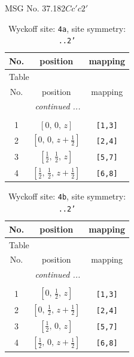 \documentclass[fleqn,8pt]{jsarticle}
\begin{document}
\setcounter{MaxMatrixCols}{32}

\renewcommand{\tablename}{Table~}
\renewcommand{\figurename}{Figure~}
\begin{center}
\LARGE
MSG No. 37.182\quad$Cc'c2'$
\end{center}
\renewcommand{\arraystretch}{1.2}
\begin{longtable}{ccc}
\caption{Wyckoff site: {\tt 4a}, site symmetry: {\tt ..2'}}
 \\
 \hline \hline
No. & position & mapping \\ \hline \endfirsthead

\multicolumn{2}{l}{\tablename\ \thetable{}} \\
 \hline \hline
No. & position & mapping \\ \hline \endhead

 \hline \hline
\multicolumn{2}{r}{\footnotesize\it continued ...} \\ \endfoot

 \hline \hline
\multicolumn{2}{r}{} \\ \endlastfoot

1 & $\left[ 0,\, 0,\, z \right]$ & {\tt [1,3]} \\ \hline
2 & $\left[ 0,\, 0,\, z + \frac{1}{2} \right]$ & {\tt [2,4]} \\ \hline
3 & $\left[ \frac{1}{2},\, \frac{1}{2},\, z \right]$ & {\tt [5,7]} \\ \hline
4 & $\left[ \frac{1}{2},\, \frac{1}{2},\, z + \frac{1}{2} \right]$ & {\tt [6,8]} \\
\end{longtable}
\renewcommand{\arraystretch}{1.2}
\begin{longtable}{ccc}
\caption{Wyckoff site: {\tt 4b}, site symmetry: {\tt ..2'}}
 \\
 \hline \hline
No. & position & mapping \\ \hline \endfirsthead

\multicolumn{2}{l}{\tablename\ \thetable{}} \\
 \hline \hline
No. & position & mapping \\ \hline \endhead

 \hline \hline
\multicolumn{2}{r}{\footnotesize\it continued ...} \\ \endfoot

 \hline \hline
\multicolumn{2}{r}{} \\ \endlastfoot

1 & $\left[ 0,\, \frac{1}{2},\, z \right]$ & {\tt [1,3]} \\ \hline
2 & $\left[ 0,\, \frac{1}{2},\, z + \frac{1}{2} \right]$ & {\tt [2,4]} \\ \hline
3 & $\left[ \frac{1}{2},\, 0,\, z \right]$ & {\tt [5,7]} \\ \hline
4 & $\left[ \frac{1}{2},\, 0,\, z + \frac{1}{2} \right]$ & {\tt [6,8]} \\
\end{longtable}
\end{document}
